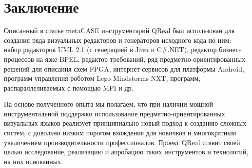 \documentclass[a4paper]{article}
\begin{document}
\section{Заключение}

Описанный в статье metaCASE инструментарий QReal был использован для создания ряда визуальных редакторов и генераторов исходного кода по ним: набор редакторов UML 2.1 (с генерацией в Java и C\#.NET), редактор бизнес-процессов на язке BPEL, редактор требований, ряд предметно-ориентированных решений для описания схем FPGA, интернет-сервисов для платформы Android, программ управления роботом Lego Mindstorms NXT, программ, распараллеливаемых с помощью MPI и др.

На основе полученного опыта мы полагаем, что при наличии мощной инструментальной поддержки использование предметно-ориентированных визуальных языков реализует принципиально новый подход к созданию сложных систем, с довольно низким порогом вхождения для новичков и многократным увеличением производительности профессионалов. Проект QReal ставит своей целью исследование, реализацию и апробацию таких инструментов и технологий, на них основанных.
\end{document}
